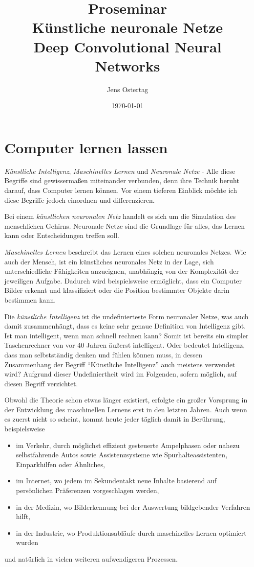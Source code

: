 \documentclass[12pt,a4]{article}
\title{\textbf{Proseminar\\Künstliche neuronale Netze\\Deep Convolutional Neural Networks}}
\author{Jens Ostertag}
\date{\today}
\begin{document}
\maketitle
\tableofcontents
\clearpage
\section{Computer lernen lassen}\label{sec:Introduction}
\textit{Künstliche Intelligenz}, \textit{Maschinelles Lernen} und \textit{Neuronale Netze} - Alle diese Begriffe sind gewissermaßen miteinander verbunden, denn ihre Technik beruht darauf, dass Computer lernen können. Vor einem tieferen Einblick möchte ich diese Begriffe jedoch einordnen und differenzieren.

Bei einem \textit{künstlichen neuronalen Netz} handelt es sich um die Simulation des menschlichen Gehirns. Neuronale Netze sind die Grundlage für alles, das Lernen kann oder Entscheidungen treffen soll.

\textit{Maschinelles Lernen} beschreibt das Lernen eines solchen neuronales Netzes. Wie auch der Mensch, ist ein künstliches neuronales Netz in der Lage, sich unterschiedliche Fähigkeiten anzueignen, unabhängig von der Komplexität der jeweiligen Aufgabe. Dadurch wird beispielsweise ermöglicht, dass ein Computer Bilder erkennt und klassifiziert oder die Position bestimmter Objekte darin bestimmen kann.

Die \textit{künstliche Intelligenz} ist die undefinierteste Form neuronaler Netze, was auch damit zusammenhängt, dass es keine sehr genaue Definition von Intelligenz gibt. Ist man intelligent, wenn man schnell rechnen kann? Somit ist bereits ein simpler Taschenrechner von vor 40 Jahren äußerst intelligent. Oder bedeutet Intelligenz, dass man selbstständig denken und fühlen können muss, in dessen Zusammenhang der Begriff \enquote{Künstliche Intelligenz} auch meistens verwendet wird?
Aufgrund dieser Undefiniertheit wird im Folgenden, sofern möglich, auf diesen Begriff verzichtet.

Obwohl die Theorie schon etwas länger existiert, erfolgte ein großer Vorsprung in der Entwicklung des maschinellen Lernens erst in den letzten Jahren. Auch wenn es zuerst nicht so scheint, kommt heute jeder täglich damit in Berührung, beispielsweise
\begin{itemize}
\item im Verkehr, durch möglichst effizient gesteuerte Ampelphasen oder nahezu selbstfahrende Autos sowie Assistenzsysteme wie Spurhalteassistenten, Einparkhilfen oder Ähnliches,
\item im Internet, wo jedem im Sekundentakt neue Inhalte basierend auf persönlichen Präferenzen vorgeschlagen werden,
\item in der Medizin, wo Bilderkennung bei der Auswertung bildgebender Verfahren hilft,
\item in der Industrie, wo Produktionsabläufe durch maschinelles Lernen optimiert wurden
\end{itemize}
und natürlich in vielen weiteren aufwendigeren Prozessen.
\end{document}
